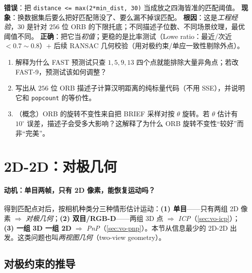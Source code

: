 \begin{pitfall}
\textbf{错误}：把 \texttt{distance <= max(2*min\_dist, 30)} 当成放之四海皆准的匹配阈值。
\textbf{现象}：换数据集后要么把好匹配筛没了、要么漏不掉误匹配。
\textbf{根因}：这是\emph{工程经验}，$30$ 是针对 $256$ 位 ORB 的下限托底；不同描述子位数、不同场景纹理，最优阈值不同。
\textbf{正确}：把它当\emph{初值}；更稳的是比率测试（Lowe ratio：最近/次近 $<0.7\sim0.8$）+ 后续 RANSAC 几何校验（用对极约束/单应一致性剔除外点）。
\end{pitfall}

\begin{practice}
\begin{enumerate}
  \item 解释为什么 FAST 预测试只查 $1,5,9,13$ 四个点就能排除大量非角点；若改 FAST-9，预测试该如何调整？
  \item 写出从 $256$ 位 ORB 描述子计算汉明距离的纯标量代码（不用 SSE），并说明它和 \texttt{popcount} 的等价性。
  \item （概念）ORB 的旋转不变性来自把 BRIEF 采样对按 $\theta$ 旋转。若 $\theta$ 估计有 $10^\circ$ 误差，描述子会受多大影响？这解释了为什么 ORB 旋转不变性“较好”而非“完美”。
\end{enumerate}
\end{practice}

\section{2D-2D：对极几何}
\label{sec:vo-epipolar}

\paragraph{动机：单目两帧，只有 2D 像素，能恢复运动吗？}
得到匹配点对后，按相机种类分三种情形估计运动\cite{gaoxiang2019slam14}：\textbf{(1) 单目}——只有两组 2D 像素 $\Rightarrow$ \emph{对极几何}；\textbf{(2) 双目/RGB-D}——两组 3D 点 $\Rightarrow$ \emph{ICP}（\cref{sec:vo-icp}）；\textbf{(3) 一组 3D 一组 2D} $\Rightarrow$ \emph{PnP}（\cref{sec:vo-pnp}）。本节从信息最少的 2D-2D 出发。这类问题也叫\emph{两视图几何}（two-view geometry）。

\subsection{对极约束的推导}
\label{sec:vo-epi-constraint}

